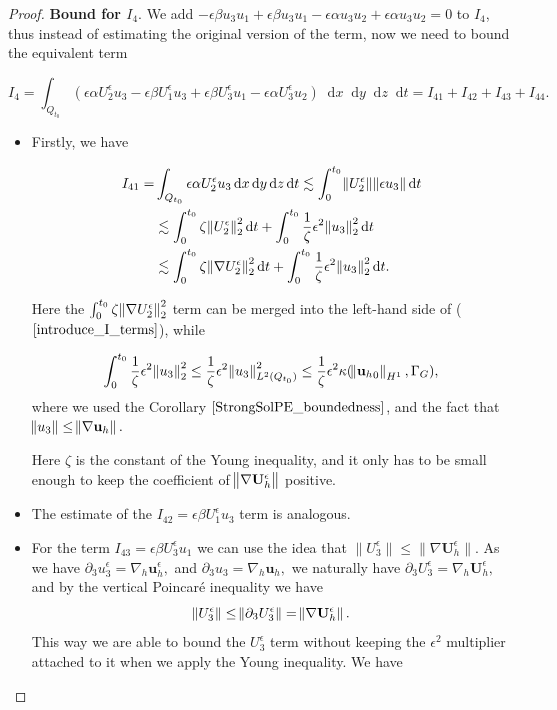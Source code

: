 \documentclass[11pt]{article}
\newcommand*\diff{\mathop{}\!\mathrm{d}}
\begin{document}
\begin{proof}
\textbf{Bound for $I_4.$} We add $ - \epsilon \beta u_3 u_1 + \epsilon \beta u_3 u_1 - \epsilon \alpha u_3 u_2 + \epsilon \alpha u_3 u_2 = 0 $ to $I_4$, thus instead of estimating the original version of the term, now we need to bound the equivalent term

$$ I_4 = \int_{Q_{t_0}} ( \epsilon \alpha U_2^\epsilon u_3 - \epsilon \beta U_1^\epsilon u_3 + \epsilon \beta U_3^\epsilon u_1 - \epsilon \alpha U_3^\epsilon u_2 ) \diff x \diff y \diff z \diff t = I_{41} + I_{42} + I_{43} + I_{44}.$$

\begin{itemize}

\item Firstly, we have

\begin{equation}
\begin{split}
I_{41} = & \int_{Q_{t_0}} \epsilon \alpha U_2^\epsilon u_3 \diff x \diff y \diff z \diff t \lesssim \int_0^{t_0} \norm{U_2^\epsilon} \norm{\epsilon u_3} \diff t \\
& \lesssim \int_0^{t_0} \zeta \norm{U_2^\epsilon}^2_2 \diff t + \int_0^{t_0} \frac{1}{\zeta} \epsilon^2 \norm{u_3}^2_2 \diff t \\
& \lesssim \int_0^{t_0} \zeta \norm{\nabla U_2^\epsilon}^2_2 \diff t + \int_0^{t_0} \frac{1}{\zeta} \epsilon^2 \norm{u_3}^2_2 \diff t.
\end{split}
\end{equation}

Here the $\int_0^{t_0} \zeta \norm{\nabla U_2^\epsilon}^2_2$ term can be merged into the left-hand side of ($\ref{introduce_I_terms}$), while

$$\int_0^{t_0} \frac{1}{\zeta} \epsilon^2 \norm{u_3}^2_2 \leq \frac{1}{\zeta} \epsilon^2 \norm{u_3}^2_{L^2(Q_{t_0})} \leq \frac{1}{\zeta} \epsilon^2 \kappa (\norm{{\mathbf{u}_h}_0}_{H^1}, \Gamma_G),$$
where we used the Corollary $\ref{StrongSolPE_boundedness}$, and the fact that $\norm{u_3} \leq \norm{\nabla \mathbf{u}_h}.$

Here $\zeta$ is the constant of the Young inequality, and it only has to be small enough to keep the coefficient of $\norm{\nabla \mathbf{U}_h^\epsilon}$ positive.

\item The estimate of the $ I_{42} = \epsilon \beta U_1^\epsilon u_3$ term is analogous.

\item For the term $ I_{43} = \epsilon \beta U_3^\epsilon u_1$ we can use the idea that $\| U_3^\epsilon \| \leq \| \nabla \mathbf{U}_h^\epsilon \|.$ As we have $\partial_3 u_3^\epsilon = \nabla_h \mathbf{u}_h^\epsilon,$ and $\partial_3 u_3 = \nabla_h \mathbf{u}_h,$ we naturally have $\partial_3 U_3^\epsilon = \nabla_h \mathbf{U}_h^\epsilon,$ and by the vertical Poincar\'e inequality we have $$\norm{U_3^\epsilon} \leq \norm{\partial_3 U_3^\epsilon} = \norm{\nabla \mathbf{U}_h^\epsilon}.$$ This way we are able to bound the $U_3^\epsilon$ term without keeping the $\epsilon^2$ multiplier attached to it when we apply the Young inequality. We have


\end{itemize}
\end{proof}
\end{document}
